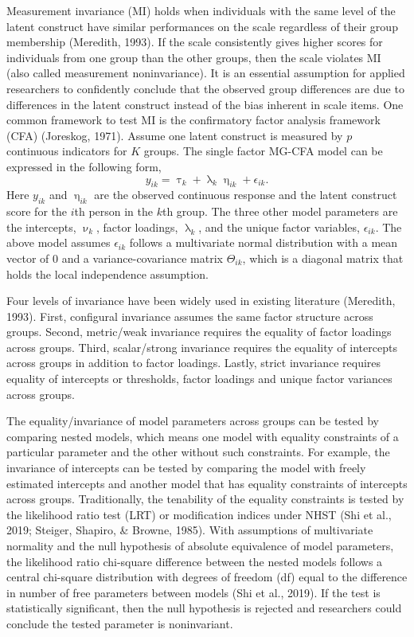 \documentclass[
  man]{apa7}
\let\eta\upeta
\let\tau\uptau
\let\nu\upnu
\begin{document}
Measurement invariance (MI) holds when individuals with the same level of the latent construct have similar performances on the scale regardless of their group membership (Meredith, 1993). If the scale consistently gives higher scores for individuals from one group than the other groups, then the scale violates MI (also called measurement noninvariance). It is an essential assumption for applied researchers to confidently conclude that the observed group differences are due to differences in the latent construct instead of the bias inherent in scale items. One common framework to test MI is the confirmatory factor analysis framework (CFA) (Joreskog, 1971). Assume one latent construct is measured by \(p\) continuous indicators for \(K\) groups. The single factor MG-CFA model can be expressed in the following form,
\begin{equation}
y_{ik} = \tau_k + \uplambda_k\eta_{ik} + \epsilon_{ik}. \label{eq:fa}
\end{equation}
Here \(y_{ik}\) and \(\eta_{ik}\) are the observed continuous response and the latent construct score for the \(i\)th person in the \(k\)th group. The three other model parameters are the intercepts, \(\nu_k\), factor loadings, \(\uplambda_k\), and the unique factor variables, \(\epsilon_{ik}\). The above model assumes \(\epsilon_{ik}\) follows a multivariate normal distribution with a mean vector of 0 and a variance-covariance matrix \(\Theta_{ik}\), which is a diagonal matrix that holds the local independence assumption.

Four levels of invariance have been widely used in existing literature (Meredith, 1993). First, configural invariance assumes the same factor structure across groups. Second, metric/weak invariance requires the equality of factor loadings across groups. Third, scalar/strong invariance requires the equality of intercepts across groups in addition to factor loadings. Lastly, strict invariance requires equality of intercepts or thresholds, factor loadings and unique factor variances across groups.

The equality/invariance of model parameters across groups can be tested by comparing nested models, which means one model with equality constraints of a particular parameter and the other without such constraints. For example, the invariance of intercepts can be tested by comparing the model with freely estimated intercepts and another model that has equality constraints of intercepts across groups. Traditionally, the tenability of the equality constraints is tested by the likelihood ratio test (LRT) or modification indices under NHST (Shi et al., 2019; Steiger, Shapiro, \& Browne, 1985). With assumptions of multivariate normality and the null hypothesis of absolute equivalence of model parameters, the likelihood ratio chi-square difference between the nested models follows a central chi-square distribution with degrees of freedom (df) equal to the difference in number of free parameters between models (Shi et al., 2019). If the test is statistically significant, then the null hypothesis is rejected and researchers could conclude the tested parameter is noninvariant.
\end{document}
